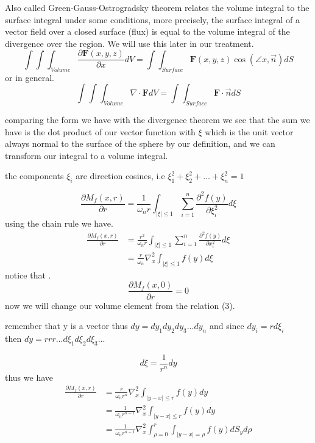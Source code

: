\documentclass[]{article}
\begin{document}
\begin{theorem}
    Also called Green-Gauss-Ostrogradsky theorem relates the volume integral to the surface integral under some conditions, more precisely, the surface integral of a vector field over a closed surface (flux) is equal to the volume integral of the divergence over the region. We will use this later in our treatment.
    \[
        \int\int\int_{Volume} \frac{\partial \textbf{F}(x,y,z)}{\partial x}dV = \int\int_{Surface} \textbf{F}(x,y,z)\cos(\angle x,\vec{n}) dS    
    \]
    or in general.
    \[
        \int\int\int_{Volume} \nabla \cdot \textbf{F} dV = \int\int_{Surface} \textbf{F}\cdot \vec{n} dS
    \]
\end{theorem}

comparing the form we have with the divergence theorem we see that the sum we have is the dot product of our vector function with $\xi$
which is the unit vector always normal to the surface of the sphere by our definition, and we can transform our integral to a volume integral.
\begin{enrichment*}{}
    the components $\xi_i$ are direction cosines, i.e $\xi_{1}^{2}+\xi_{2}^{2}+...+\xi_{n}^{2} = 1$
\end{enrichment*}
\[
    \frac{\partial M_f (x,r)}{\partial r} = \frac{1}{\omega_n r} \int_{|\xi|\leq 1} \sum_{i=1}^{n} \frac{\partial^2 f(y)}{\partial \xi_{i}^{2}} d\xi    
\]
using the chain rule we have.
\begin{align*}
\frac{\partial M_f (x,r)}{\partial r} &= \frac{r^2}{\omega_n r} \int_{|\xi|\leq 1} \sum_{i=1}^{n} \frac{\partial^2 f(y)}{\partial x_{i}^{2}} d\xi
\\
&=\frac{r}{\omega_n} \nabla_{x}^{2} \int_{|\xi|\leq 1} f(y)d\xi
\end{align*}
notice that .
\[
    \frac{\partial M_f (x,0)}{\partial r} = 0    
\]
now we will change our volume element from the relation (3).
\begin{enrichment*}{}
    remember that y is a vector thus $dy = dy_1 dy_2 dy_3 ...dy_n$ and since $dy_i = rd\xi_i$ 
    \\
    then $dy = rrr...d\xi_1 d\xi_2 d\xi_3 ...$
\end{enrichment*}
\[
    d\xi = \frac{1}{r^n}dy    
\]
thus we have 
\begin{align*}
\frac{\partial M_f (x,r)}{\partial r} &= \frac{r}{\omega_n r^n} \nabla_{x}^{2} \int_{|y-x|\leq r} f(y)dy
\\
&= \frac{1}{\omega_n r^{n-1}} \nabla_{x}^{2} \int_{|y-x|\leq r} f(y)dy
\\
&= \frac{1}{\omega_n r^{n-1}} \nabla_{x}^{2} \int_{\rho = 0}^{r} \int_{|y-x| = \rho} f(y)dS_y d\rho
\end{align*}
\end{document}
